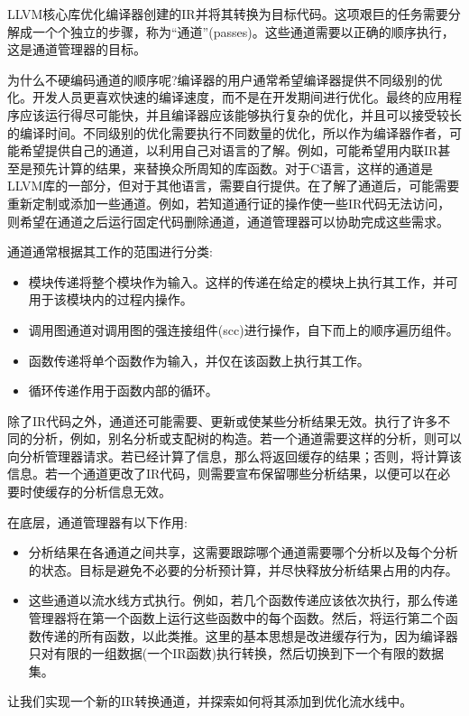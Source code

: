 LLVM核心库优化编译器创建的IR并将其转换为目标代码。这项艰巨的任务需要分解成一个个独立的步骤，称为“通道”(passes)。这些通道需要以正确的顺序执行，这是通道管理器的目标。

为什么不硬编码通道的顺序呢?编译器的用户通常希望编译器提供不同级别的优化。开发人员更喜欢快速的编译速度，而不是在开发期间进行优化。最终的应用程序应该运行得尽可能快，并且编译器应该能够执行复杂的优化，并且可以接受较长的编译时间。不同级别的优化需要执行不同数量的优化，所以作为编译器作者，可能希望提供自己的通道，以利用自己对语言的了解。例如，可能希望用内联IR甚至是预先计算的结果，来替换众所周知的库函数。对于C语言，这样的通道是LLVM库的一部分，但对于其他语言，需要自行提供。在了解了通道后，可能需要重新定制或添加一些通道。例如，若知道通行证的操作使一些IR代码无法访问，则希望在通道之后运行固定代码删除通道，通道管理器可以协助完成这些需求。

通道通常根据其工作的范围进行分类:

\begin{itemize}
\item
模块传递将整个模块作为输入。这样的传递在给定的模块上执行其工作，并可用于该模块内的过程内操作。

\item
调用图通道对调用图的强连接组件(scc)进行操作，自下而上的顺序遍历组件。

\item
函数传递将单个函数作为输入，并仅在该函数上执行其工作。

\item
循环传递作用于函数内部的循环。
\end{itemize}

除了IR代码之外，通道还可能需要、更新或使某些分析结果无效。执行了许多不同的分析，例如，别名分析或支配树的构造。若一个通道需要这样的分析，则可以向分析管理器请求。若已经计算了信息，那么将返回缓存的结果；否则，将计算该信息。若一个通道更改了IR代码，则需要宣布保留哪些分析结果，以便可以在必要时使缓存的分析信息无效。

在底层，通道管理器有以下作用:

\begin{itemize}
\item
分析结果在各通道之间共享，这需要跟踪哪个通道需要哪个分析以及每个分析的状态。目标是避免不必要的分析预计算，并尽快释放分析结果占用的内存。

\item
这些通道以流水线方式执行。例如，若几个函数传递应该依次执行，那么传递管理器将在第一个函数上运行这些函数中的每个函数。然后，将运行第二个函数传递的所有函数，以此类推。这里的基本思想是改进缓存行为，因为编译器只对有限的一组数据(一个IR函数)执行转换，然后切换到下一个有限的数据集。
\end{itemize}

让我们实现一个新的IR转换通道，并探索如何将其添加到优化流水线中。
















